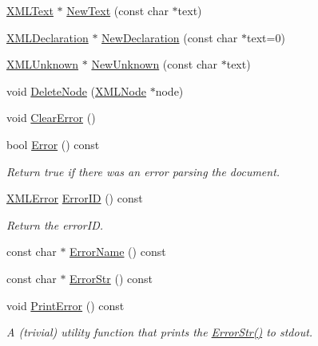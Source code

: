 \begin{DoxyCompactItemize}
\item 
\mbox{\hyperlink{classtinyxml2_1_1_x_m_l_text}{X\+M\+L\+Text}} $\ast$ \mbox{\hyperlink{classtinyxml2_1_1_x_m_l_document_acece5de77a0819f2341b08c1e1ed9987}{New\+Text}} (const char $\ast$text)
\item 
\mbox{\hyperlink{classtinyxml2_1_1_x_m_l_declaration}{X\+M\+L\+Declaration}} $\ast$ \mbox{\hyperlink{classtinyxml2_1_1_x_m_l_document_ae519030c0262fa2daff8993681990e16}{New\+Declaration}} (const char $\ast$text=0)
\item 
\mbox{\hyperlink{classtinyxml2_1_1_x_m_l_unknown}{X\+M\+L\+Unknown}} $\ast$ \mbox{\hyperlink{classtinyxml2_1_1_x_m_l_document_a4954f502c5fd7f49de54c3c0c99bb73d}{New\+Unknown}} (const char $\ast$text)
\item 
void \mbox{\hyperlink{classtinyxml2_1_1_x_m_l_document_ac1d6e2c7fcc1a660624ac4f68e96380d}{Delete\+Node}} (\mbox{\hyperlink{classtinyxml2_1_1_x_m_l_node}{X\+M\+L\+Node}} $\ast$node)
\item 
void \mbox{\hyperlink{classtinyxml2_1_1_x_m_l_document_a4085d9c52f1d93214311459d6d1fcf17}{Clear\+Error}} ()
\item 
bool \mbox{\hyperlink{classtinyxml2_1_1_x_m_l_document_a34e6318e182e40e3cc4f4ba5d59ed9ed}{Error}} () const
\begin{DoxyCompactList}\small\item\em Return true if there was an error parsing the document. \end{DoxyCompactList}\item 
\mbox{\hyperlink{namespacetinyxml2_a1fbf88509c3ac88c09117b1947414e08}{X\+M\+L\+Error}} \mbox{\hyperlink{classtinyxml2_1_1_x_m_l_document_afa3ed33b3107f920ec2b301f805ac17d}{Error\+ID}} () const
\begin{DoxyCompactList}\small\item\em Return the error\+ID. \end{DoxyCompactList}\item 
const char $\ast$ \mbox{\hyperlink{classtinyxml2_1_1_x_m_l_document_a1a5f2b63427caffd4cde15781d9d11f9}{Error\+Name}} () const
\item 
const char $\ast$ \mbox{\hyperlink{classtinyxml2_1_1_x_m_l_document_ae97fff2402a0d01e0509c430b37996b3}{Error\+Str}} () const
\item 
void \mbox{\hyperlink{classtinyxml2_1_1_x_m_l_document_a1d033945b42e125d933d6231e4571552}{Print\+Error}} () const
\begin{DoxyCompactList}\small\item\em A (trivial) utility function that prints the \mbox{\hyperlink{classtinyxml2_1_1_x_m_l_document_ae97fff2402a0d01e0509c430b37996b3}{Error\+Str()}} to stdout. \end{DoxyCompactList}\item 

\end{DoxyCompactItemize}
